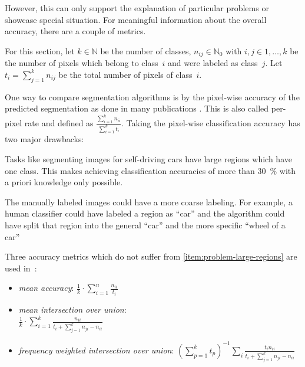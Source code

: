 However, this can only support the explanation of particular problems or
showcase special situation. For meaningful information about the overall
accuracy, there are a couple of metrics.

For this section, let $k \in \mathbb{N}$ be the number of classes, $n_{ij} \in
\mathbb{N}_0$ with $i,j \in 1, \dots, k$ be the number of pixels which belong to
class~$i$ and were labeled as class~$j$. Let $t_i = \sum_{j=1}^k n_{ij}$ be the
total number of pixels of class~$i$.

One way to compare segmentation algorithms is by the pixel-wise accuracy of the
predicted segmentation as done in many publications
\cite{shotton2006textonboost,csurka2008simple,long2014fully}. This is also
called per-pixel rate and defined as $\frac{\sum_{i=1}^k n_{ii}}{\sum_{i=1}^k
t_i}$. Taking the pixel-wise classification accuracy has two major drawbacks:

\begin{problemnr}
    \item \label{item:problem-large-regions} Tasks like segmenting images for self-driving cars have large regions
          which have one class. This makes achieving classification accuracies
          of more than \SI{30}{\percent} with a priori knowledge only possible.
    \item \label{item:problem-labeling-granularity} The manually labeled images
          could have a more coarse labeling. For example, a human classifier
          could have labeled a region as
          \enquote{car} and the algorithm could have split that region into
          the general \enquote{car} and the more specific \enquote{wheel of a
          car}
\end{problemnr}
\goodbreak
Three accuracy metrics which do not suffer from
\cref{item:problem-large-regions} are used in~\cite{long2014fully}:\nobreak%
\begin{itemize}
    \item \textit{mean accuracy}: $\frac{1}{k} \cdot \sum_{i=1}^n \frac{n_{ii}}{t_i}$
    \item \textit{mean intersection over union}: \hfill\\$\frac{1}{k} \cdot \sum_{i=1}^k \frac{n_{ii}}{t_i + \sum_{j=1}^k n_{ji}-n_{ii}}$
    \item \textit{frequency weighted intersection over union}:
          ${({\sum_{p=1}^k t_p})}^{-1} \sum_i \frac{t_i n_{ii}}{t_i + \sum_{j=1}^k n_{ji} - n_{ii}}$
\end{itemize}

